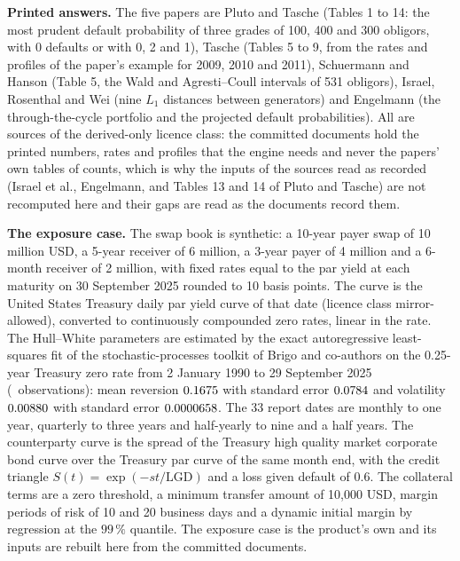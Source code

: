 \textbf{Printed answers.} The five papers are Pluto and Tasche \citep{plutotasche2005} (Tables 1 to 14: the most prudent default probability of three grades of 100, 400 and 300 obligors, with 0 defaults or with 0, 2 and 1), Tasche \citep{tasche2013} (Tables 5 to 9, from the rates and profiles of the paper's example for 2009, 2010 and 2011), Schuermann and Hanson \citep{schuermann2004} (Table 5, the Wald and Agresti--Coull intervals of 531 obligors), Israel, Rosenthal and Wei \citep{israel2001} (nine $L_1$ distances between generators) and Engelmann \citep{engelmann2024} (the through-the-cycle portfolio and the projected default probabilities). All are sources of the derived-only licence class: the committed documents hold the printed numbers, rates and profiles that the engine needs and never the papers' own tables of counts, which is why the inputs of the sources read as recorded (Israel et al., Engelmann, and Tables 13 and 14 of Pluto and Tasche) are not recomputed here and their gaps are read as the documents record them.

\textbf{The exposure case.} The swap book is synthetic: a 10-year payer swap of 10 million USD, a 5-year receiver of 6 million, a 3-year payer of 4 million and a 6-month receiver of 2 million, with fixed rates equal to the par yield at each maturity on 30 September 2025 rounded to 10 basis points. The curve is the United States Treasury daily par yield curve of that date (licence class mirror-allowed), converted to continuously compounded zero rates, linear in the rate. The Hull--White parameters are estimated by the exact autoregressive least-squares fit of the stochastic-processes toolkit of Brigo and co-authors \citep{brigo2008} on the 0.25-year Treasury zero rate from 2 January 1990 to 29 September 2025 (\nHWobs\ observations): mean reversion $0.1675$ with standard error $0.0784$ and volatility $0.00880$ with standard error $0.0000658$. The 33 report dates are monthly to one year, quarterly to three years and half-yearly to nine and a half years. The counterparty curve is the spread of the Treasury high quality market corporate bond curve over the Treasury par curve of the same month end, with the credit triangle $S(t)=\exp(-st/\mathrm{LGD})$ and a loss given default of $0.6$. The collateral terms are a zero threshold, a minimum transfer amount of 10,000 USD, margin periods of risk of 10 and 20 business days and a dynamic initial margin by regression at the $99\,\%$ quantile. The exposure case is the product's own and its inputs are rebuilt here from the committed documents.

